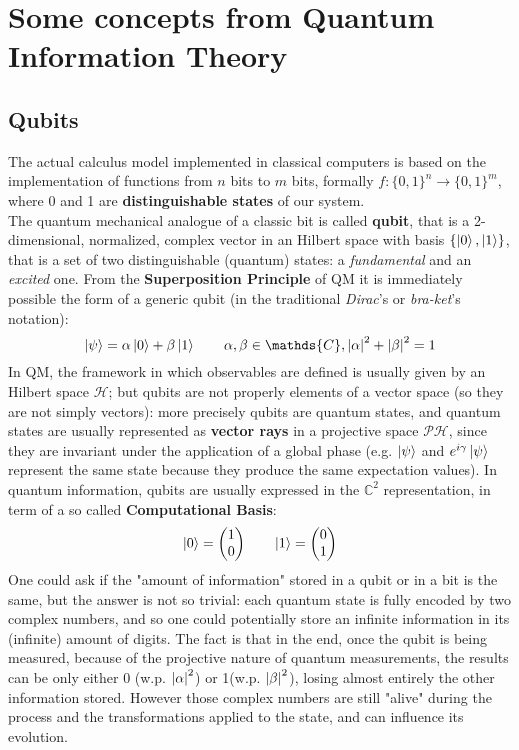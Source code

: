\hfill

\section{Some concepts from Quantum Information Theory \cite{Manzali}}

\subsection{Qubits}
The actual calculus model implemented in classical computers is based on the implementation of functions from $n$ bits to $m$ bits, formally $f:\{0,1\}^n\to\{0,1\}^m$, where 0 and 1 are \textbf{distinguishable states} of our system.\\
The quantum mechanical analogue of a classic bit is called \textbf{qubit}, that is a 2-dimensional, normalized, complex vector in an Hilbert space with basis $\{\ket{0},\ket{1}\}$, that is a set of two distinguishable (quantum) states: a \textit{fundamental} and an \textit{excited} one. From the \textbf{Superposition Principle} of QM it is immediately possible the form of a generic qubit		(in the traditional \textit{Dirac}'s or \textit{bra-ket}'s notation):
\[ \ket{\psi} = \alpha\ket{0}+\beta\ket{1} \qquad \alpha,\beta\in\mathds{C}, \abs{\alpha}^2+\abs{\beta}^2=1 \]
In QM, the framework in which observables are defined is usually given by an Hilbert space $\mathcal{H}$; but qubits are not properly elements of a vector space (so they are not simply vectors): more precisely qubits are quantum states, and quantum states are usually represented as \textbf{vector rays} in a projective space $\mathcal{P}\mathcal{H}$, since they are invariant under the application of a global phase (e.g. $\ket{\psi}$ and $e^{i\gamma}\ket{\psi}$ represent the same state because they produce the same expectation values). In quantum information, qubits are usually expressed in the $\mathds{C}^2$ representation, in term of a so called \textbf{Computational Basis}:
\[ \ket{0} = \begin{pmatrix}1\\0\end{pmatrix} \qquad \ket{1} = \begin{pmatrix}0\\1\end{pmatrix} \] 
One could ask if the "amount of information" stored in a qubit or in a bit is the same, but the answer is not so trivial: each quantum state is fully encoded by two complex numbers, and so one could potentially store an infinite information in its (infinite) amount of digits. The fact is that in the end, once the qubit is being measured, because of the projective nature of quantum measurements, the results can be only either 0 (w.p. $\abs{\alpha}^2$) or 1(w.p. $\abs{\beta}^2$), losing almost entirely the other information stored. However those complex numbers are still "alive" during the process and the transformations applied to the state, and can influence its evolution.\\
